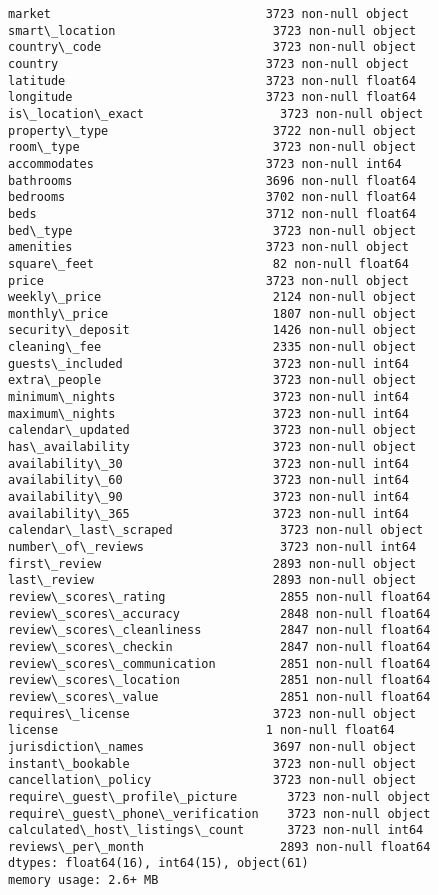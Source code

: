 \documentclass[11pt]{article}
\begin{document}
\begin{Verbatim}[commandchars=\\\{\}]
market                              3723 non-null object
smart\_location                      3723 non-null object
country\_code                        3723 non-null object
country                             3723 non-null object
latitude                            3723 non-null float64
longitude                           3723 non-null float64
is\_location\_exact                   3723 non-null object
property\_type                       3722 non-null object
room\_type                           3723 non-null object
accommodates                        3723 non-null int64
bathrooms                           3696 non-null float64
bedrooms                            3702 non-null float64
beds                                3712 non-null float64
bed\_type                            3723 non-null object
amenities                           3723 non-null object
square\_feet                         82 non-null float64
price                               3723 non-null object
weekly\_price                        2124 non-null object
monthly\_price                       1807 non-null object
security\_deposit                    1426 non-null object
cleaning\_fee                        2335 non-null object
guests\_included                     3723 non-null int64
extra\_people                        3723 non-null object
minimum\_nights                      3723 non-null int64
maximum\_nights                      3723 non-null int64
calendar\_updated                    3723 non-null object
has\_availability                    3723 non-null object
availability\_30                     3723 non-null int64
availability\_60                     3723 non-null int64
availability\_90                     3723 non-null int64
availability\_365                    3723 non-null int64
calendar\_last\_scraped               3723 non-null object
number\_of\_reviews                   3723 non-null int64
first\_review                        2893 non-null object
last\_review                         2893 non-null object
review\_scores\_rating                2855 non-null float64
review\_scores\_accuracy              2848 non-null float64
review\_scores\_cleanliness           2847 non-null float64
review\_scores\_checkin               2847 non-null float64
review\_scores\_communication         2851 non-null float64
review\_scores\_location              2851 non-null float64
review\_scores\_value                 2851 non-null float64
requires\_license                    3723 non-null object
license                             1 non-null float64
jurisdiction\_names                  3697 non-null object
instant\_bookable                    3723 non-null object
cancellation\_policy                 3723 non-null object
require\_guest\_profile\_picture       3723 non-null object
require\_guest\_phone\_verification    3723 non-null object
calculated\_host\_listings\_count      3723 non-null int64
reviews\_per\_month                   2893 non-null float64
dtypes: float64(16), int64(15), object(61)
memory usage: 2.6+ MB

    \end{Verbatim}
\end{document}

